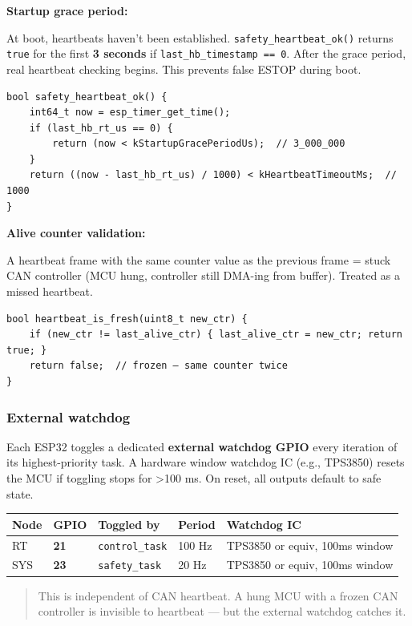 \documentclass[12pt,a4paper,oneside]{report}
\begin{document}
\textbf{Startup grace period:}

At boot, heartbeats haven't been established. \texttt{safety\_heartbeat\_ok()}
returns \texttt{true} for the first \textbf{3 seconds} if
\texttt{last\_hb\_timestamp\ ==\ 0}. After the grace period, real heartbeat
checking begins. This prevents false ESTOP during boot.

\begin{verbatim}
bool safety_heartbeat_ok() {
    int64_t now = esp_timer_get_time();
    if (last_hb_rt_us == 0) {
        return (now < kStartupGracePeriodUs);  // 3_000_000
    }
    return ((now - last_hb_rt_us) / 1000) < kHeartbeatTimeoutMs;  // 1000
}
\end{verbatim}

\textbf{Alive counter validation:}

A heartbeat frame with the same counter value as the previous frame = stuck CAN
controller (MCU hung, controller still DMA-ing from buffer). Treated as a missed
heartbeat.

\begin{verbatim}
bool heartbeat_is_fresh(uint8_t new_ctr) {
    if (new_ctr != last_alive_ctr) { last_alive_ctr = new_ctr; return true; }
    return false;  // frozen — same counter twice
}
\end{verbatim}

\subsubsection{External watchdog}\label{external-watchdog}

Each ESP32 toggles a dedicated \textbf{external watchdog GPIO} every iteration
of its highest-priority task. A hardware window watchdog IC (e.g., TPS3850)
resets the MCU if toggling stops for \textgreater100 ms. On reset, all outputs
default to safe state.

\begin{longtable}[]{@{}lllll@{}}
\toprule\noalign{}
Node & GPIO & Toggled by & Period & Watchdog IC \\
\midrule\noalign{}
\endhead
\bottomrule\noalign{}
\endlastfoot
RT & \textbf{21} & \texttt{control\_task} & 100 Hz & TPS3850 or equiv, 100ms
window \\
SYS & \textbf{23} & \texttt{safety\_task} & 20 Hz & TPS3850 or equiv, 100ms
window \\
\end{longtable}

\begin{quote}
This is independent of CAN heartbeat. A hung MCU with a frozen CAN controller is
invisible to heartbeat --- but the external watchdog catches it.
\end{quote}
\end{document}

